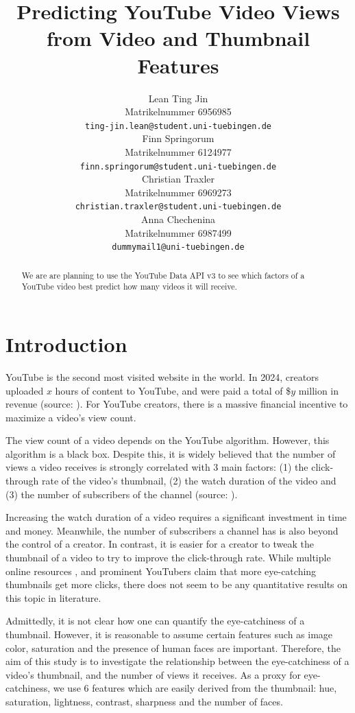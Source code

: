 \documentclass{article}
\title{Predicting YouTube Video Views \\from Video and Thumbnail Features}
\author{%
  Lean Ting Jin\\
  Matrikelnummer 6956985\\
  \texttt{ting-jin.lean@student.uni-tuebingen.de} \\
  \And
  Finn Springorum\\
  Matrikelnummer 6124977\\
  \texttt{finn.springorum@student.uni-tuebingen.de} \\
  \And
  Christian Traxler\\
  Matrikelnummer 6969273\\
  \texttt{christian.traxler@student.uni-tuebingen.de} \\
  \And
  Anna Chechenina\\
  Matrikelnummer 6987499\\
  \texttt{dummymail1@uni-tuebingen.de} \\
}
\begin{document}
\maketitle

\begin{abstract}
  We are are planning to use the YouTube Data API v3 \cite{youtubeapi} to see which factors of a YouTube video best predict how many videos it will receive. 

\end{abstract}

\section{Introduction}
YouTube is the second most visited website in the world. In 2024, creators uploaded $x$ hours of content to YouTube, and were paid a total of \$$y$ million in revenue (source: \cite{}). For YouTube creators, there is a massive financial incentive to maximize a video's view count.

The view count of a video depends on the YouTube algorithm. However, this algorithm is a black box. Despite this, it is widely believed that the number of views a video receives is strongly correlated with 3 main factors: (1) the click-through rate of the video's thumbnail, (2) the watch duration of the video and (3) the number of subscribers of the channel (source: \cite{}).


Increasing the watch duration of a video requires a significant investment in time and money. Meanwhile, the number of subscribers a channel has is also beyond the control of a creator. In contrast, it is easier for a creator to tweak the thumbnail of a video to try to improve the click-through rate. While multiple online resources \cite{}, and prominent YouTubers \cite{} claim that more eye-catching thumbnails get more clicks, there does not seem to be any quantitative results on this topic in literature.


Admittedly, it is not clear how one can quantify the eye-catchiness of a thumbnail. However, it is reasonable to assume certain features such as image color, saturation and the presence of human faces are important. Therefore, the aim of this study is to investigate the relationship between the eye-catchiness of a video's thumbnail, and the number of views it receives. As a proxy for eye-catchiness, we use 6 features which are easily derived from the thumbnail: hue, saturation, lightness, contrast, sharpness and the number of faces.
\end{document}
